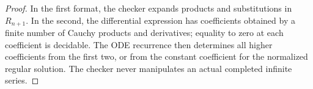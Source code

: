 \begin{proof}
In the first format, the checker expands products and substitutions in
\(R_{n+1}\).  In the second, the differential expression has coefficients
obtained by a finite number of Cauchy products and derivatives; equality to
zero at each coefficient is decidable.  The ODE recurrence then determines
all higher coefficients from the first two, or from the constant coefficient
for the normalized regular solution.  The checker never manipulates an
actual completed infinite series.
\end{proof}
